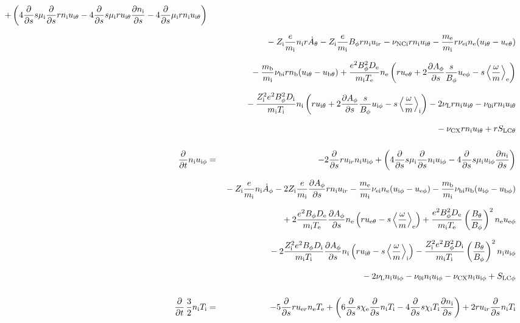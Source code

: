 \documentclass[11pt]{article}
\def\r#1{{\rm#1}}
\def\ddt{\frac{\partial}{\partial t}}
\def\dds{\frac{\partial}{\partial s}}
\def\dd#1{\frac{\partial #1}{\partial s}}
\def\ave#1{\left\langle#1\right\rangle}
\def\me{m_\r{e}}
\def\mi{m_\r{i}}
\def\mb{m_\r{b}}
\def\mui{\mu_\r{i}}
\def\De{D_\r{e}}
\def\Di{D_\r{i}}
\def\chie{\chi_\r{e}}
\def\chii{\chi_\r{i}}
\def\ne{n_\r{e}}
\def\ni{n_\r{i}}
\def\nb{n_\r{b}}
\def\uer{u_{\r{e}r}}
\def\uir{u_{\r{i}r}}
\def\ueth{u_{\r{e}\theta}}
\def\uith{u_{\r{i}\theta}}
\def\ubth{u_{\r{b}\theta}}
\def\ueph{u_{\r{e}\phi}}
\def\uiph{u_{\r{i}\phi}}
\def\ubph{u_{\r{b}\phi}}
\def\Bth{B_\theta}
\def\Bph{B_\phi}
\def\Athd{\dot{A}_\theta}
\def\Aphd{\dot{A}_\phi}
\def\Aph{A_\phi}
\def\Te{T_\r{e}}
\def\Ti{T_\r{i}}
\def\Zi{Z_\r{i}}
\def\nuNCi{\nu_\r{NCi}}
\def\nuei{\nu_\r{ei}}
\def\nubi{\nu_\r{bi}}
\def\nuni{\nu_\r{0i}}
\def\nuL{\nu_\r{L}}
\def\nuCX{\nu_\r{CX}}
\begin{document}
\begin{eqnarray}
%
  + \left(   4 \dds s \mui \dds r \ni \uith
%
           - 4 \dds s \mui r \uith \dd{\ni}
%
	   - 4 \dds \mui r \ni \uith \right)
\nonumber\\[2.5mm]&&{}
%
  - \Zi \frac{e}{\mi} \ni r \Athd
%
  - \Zi \frac{e}{\mi} \Bph r \ni \uir
%
  - \nuNCi r \ni \uith
%
  - \frac{\me}{\mi} r \nuei \ne (\uith - \ueth)
\nonumber\\[2.5mm]&&{}
%
  - \frac{\mb}{\mi} \nu_\r{bi} r \nb (\uith - \ubth)
%
  + \frac{e^2 \Bph^2 \De}{\mi\Te}\ne
    \left(r \ueth + 2\dd{\Aph}\frac{s}{\Bph}\ueph - s
     \ave{\frac{\omega}{m}}_\r{e} \right)
\nonumber\\[2.5mm]&&{}
%
  - \frac{\Zi^2 e^2 \Bph^2 \Di}{\mi\Ti}\ni
    \left(r \uith + 2\dd{\Aph}\frac{s}{\Bph}\uiph - s
     \ave{\frac{\omega}{m}}_\r{i} \right)
%
  - 2 \nuL r \ni \uith
%
  - \nuni r \ni \uith
\nonumber\\[2.5mm]&&{}
%
  - \nuCX r \ni \uith
%
  + r S_\r{LC\theta}
%
%
\\[5mm]
%
%
  \ddt \ni \uiph &=&
%
  - 2 \dds r \uir \ni \uiph
%
  + \left(   4 \dds s \mui \dds \ni \uiph
%
           - 4 \dds s \mui \uiph \dd{\ni} \right)
\nonumber\\[2.5mm]&&{}
%
  - \Zi \frac{e}{\mi} \ni \Aphd
%
  - 2 \Zi \frac{e}{\mi} \dd{\Aph} r \ni \uir 
%
  - \frac{\me}{\mi} \nuei \ne (\uiph - \ueph)
%
  - \frac{\mb}{\mi} \nubi \nb (\uiph - \ubph)
\nonumber\\[2.5mm]&&{}
%
  + 2\frac{e^2 \Bph \De}{\mi\Te}\dd{\Aph}\ne
    \left(r \ueth - s \ave{\frac{\omega}{m}}_\r{e} \right)
  + \frac{e^2 \Bph^2 \De}{\mi\Te}\left(\frac{\Bth}{\Bph}\right)^2\ne\ueph
\nonumber\\[2.5mm]&&{}
%
  - 2\frac{\Zi^2 e^2 \Bph \Di}{\mi\Ti}\dd{\Aph}\ni
    \left(r \uith - s \ave{\frac{\omega}{m}}_\r{i} \right)
  - \frac{\Zi^2 e^2 \Bph^2 \Di}{\mi\Ti}\left(\frac{\Bth}{\Bph}\right)^2\ni\uiph
\nonumber\\[2.5mm]&&{}
%
  - 2 \nuL \ni \uiph
%
  - \nuni \ni \uiph
%
  - \nuCX \ni \uiph
%
  + S_\r{LC\phi}
%
%
\\[5mm]
%
%
  \ddt \, \frac{3}{2} \ni \Ti &=&
%
  - 5 \dds r \uer \ne \Te
%
  + \left(   6 \dds s \chie \dds \ni \Ti 
%
           - 4 \dds s \chii \Ti \dd{\ni} \right)
%
  + 2 r \uir \dds \ni \Ti

\end{eqnarray}
\end{document}
